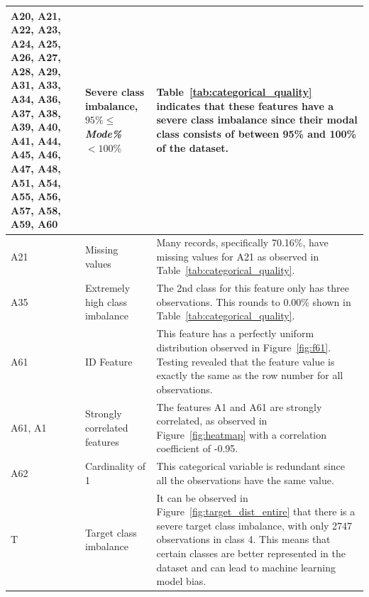 \documentclass[11pt]{article}
\begin{document}
\begin{longtable}{|p{1.7cm}|p{4cm}|p{8cm}|}
	\hline
	A20, A21, A22, A23, A24, A25, A26, A27, A28, A29, A31, A33, A34, A36, A37, A38, A39, A40, A41, A44, A45, A46, A47, A48, A51, A54, A55, A56, A57, A58, A59, A60 & Severe class imbalance, $95\%\le$\textit{Mode\%} $< 100\%$ & Table~\ref{tab:categorical_quality} indicates that these features have a severe class imbalance since their modal class consists of between 95\% and 100\% of the dataset. \\
	\hline
	A21 & Missing values & Many records, specifically 70.16\%, have missing values for A21 as observed in Table~\ref{tab:categorical_quality}. \\
	\hline
	A35 & Extremely high class imbalance& The 2nd class for this feature only has three observations. This rounds to 0.00\% shown in Table~\ref{tab:categorical_quality}. \\
	\hline
	A61 & ID Feature & This feature has a perfectly uniform distribution observed in Figure~\ref{fig:f61}. Testing revealed that the feature value is exactly the same as the row number for all observations. \\
	\hline
	A61, A1 & Strongly correlated features & The features A1 and A61 are strongly correlated, as observed in Figure~\ref{fig:heatmap} with a correlation coefficient of -0.95. \\
	\hline
	A62 & Cardinality of 1 & This categorical variable is redundant since all the observations have the same value. \\
	\hline
	T & Target class imbalance &  It can be observed in Figure~\ref{fig:target_dist_entire} that there is a severe target class imbalance, with only 2747 observations in class 4.  This means that certain classes are better represented in the dataset and can lead to machine learning model bias. \\
	\hline
\end{longtable}
\end{document}
